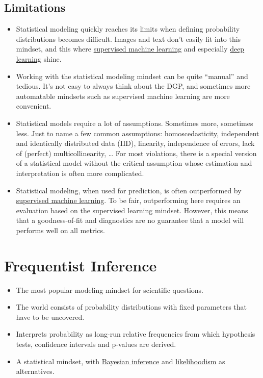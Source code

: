 \documentclass[
  10pt,
]{scrbook}
\providecommand{\tightlist}{%
  \setlength{\itemsep}{0pt}\setlength{\parskip}{0pt}}
\begin{document}
\hypertarget{limitations}{%
\section{Limitations}\label{limitations}}

\begin{itemize}
\tightlist
\item
  Statistical modeling quickly reaches its limits when defining probability distributions becomes difficult. Images and text don't easily fit into this mindset, and this where \protect\hyperlink{supervised-ml}{supervised machine learning} and especially \protect\hyperlink{deep-learning}{deep learning} shine.
\item
  Working with the statistical modeling mindset can be quite ``manual'' and tedious. It's not easy to always think about the DGP, and sometimes more automatable mindsets such as supervised machine learning are more convenient.
\item
  Statistical models require a lot of assumptions. Sometimes more, sometimes less. Just to name a few common assumptions: homoscedasticity, independent and identically distributed data (IID), linearity, independence of errors, lack of (perfect) multicollinearity, \ldots{} For most violations, there is a special version of a statistical model without the critical assumption whose estimation and interpretation is often more complicated.
\item
  Statistical modeling, when used for prediction, is often outperformed by \protect\hyperlink{supervised-ml}{supervised machine learning}. To be fair, outperforming here requires an evaluation based on the supervised learning mindset. However, this means that a goodness-of-fit and diagnostics are no guarantee that a model will performs well on all metrics.
\end{itemize}

\hypertarget{statistical-inference}{%
\chapter{Frequentist Inference}\label{statistical-inference}}

\begin{itemize}
\tightlist
\item
  The most popular modeling mindset for scientific questions.
\item
  The world consists of probability distributions with fixed parameters that have to be uncovered.
\item
  Interprets probability as long-run relative frequencies from which hypothesis tests, confidence intervals and p-values are derived.
\item
  A statistical mindset, with \protect\hyperlink{bayesian}{Bayesian inference} and \protect\hyperlink{likelihoodism}{likelihoodism} as alternatives.
\end{itemize}
\end{document}
